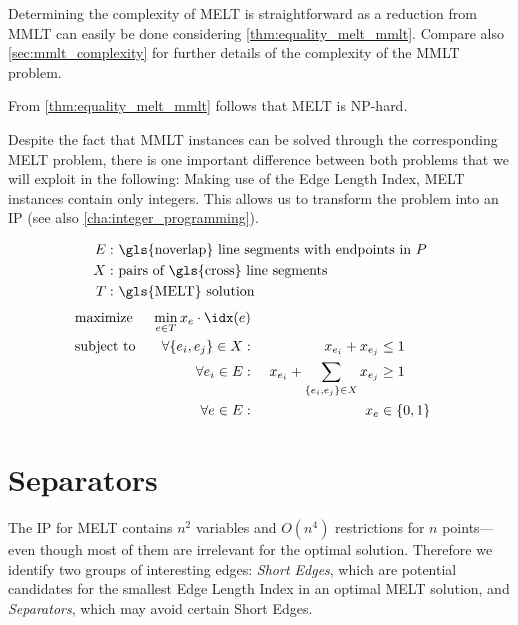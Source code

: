 Determining the complexity of \gls{MELT} is straightforward as a reduction
from \gls{MMLT} can easily be done considering
\cref{thm:equality_melt_mmlt}. Compare also \cref{sec:mmlt_complexity}
for further details of the complexity of the \gls{MMLT} problem.

\begin{theorem}
  From \cref{thm:equality_melt_mmlt} follows
  that \gls{MELT} is NP-hard.
\end{theorem}

Despite the fact that \gls{MMLT} instances can be solved through the
corresponding \gls{MELT} problem, there is one important difference
between both problems that we will exploit in the following: Making
use of the Edge Length Index, \gls{MELT} instances contain only
integers. This allows us to transform the problem into an \gls{IP}
(see also \cref{cha:integer_programming}).

\begin{problem}
  \hfill
  \begin{alignat*}{1}
    E: &~ \text{\gls{noverlap} line segments with endpoints in \(P\)} \\
    X: &~ \text{pairs of \gls{cross} line segments} \\
    T: &~ \text{\gls{MELT} solution}
  \end{alignat*}
  \begin{alignat*}{3}
    &\text{maximize } & \min\limits_{e \in T} x_e \cdot \idx(e) \\
    &\text{subject to } & \forall \{e_i,e_j\} \in X : &~& x_{e_i} + x_{e_j} &\leq 1 \\
    && \forall e_i \in E : &~
      & x_{e_i} + \sum\limits_{\{e_i, e_j\} \in X} x_{e_j} &\geq 1 \\
    && \forall e \in E : &~& x_e &\in \{0,1\}
  \end{alignat*}
\end{problem}

\section{Separators}
The \gls{IP} for \gls{MELT} contains \(n^2\) variables and
\(O(n^4)\) restrictions for \(n\) points---even though most of them
are irrelevant for the optimal solution. Therefore we identify two
groups of interesting edges: \emph{Short Edges}, which are potential
candidates for the smallest Edge Length Index in an optimal
\gls{MELT} solution, and \emph{Separators}, which may avoid certain
Short Edges.

